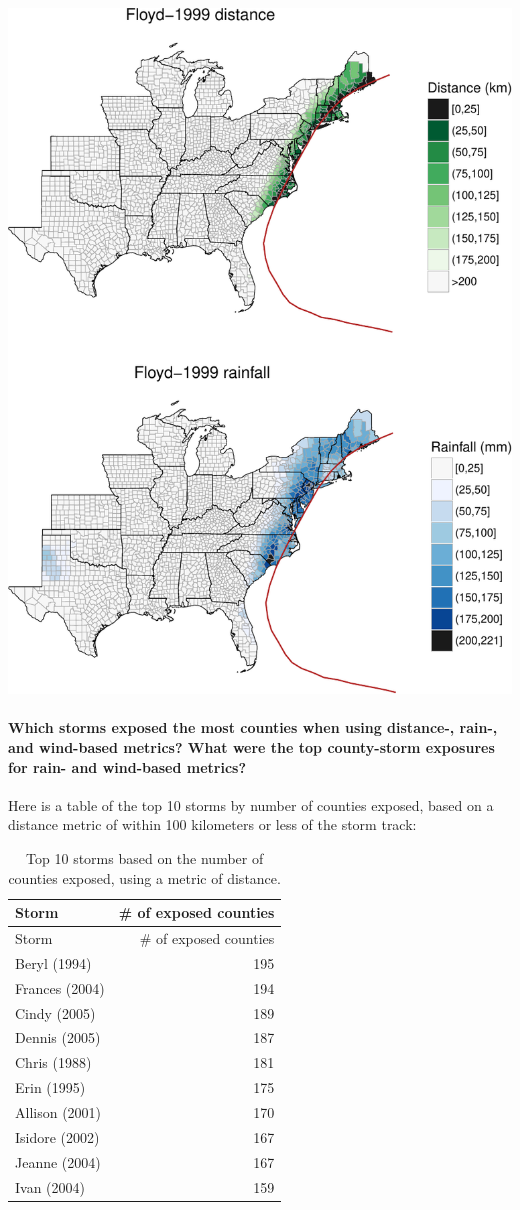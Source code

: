 \documentclass[]{elsarticle} %
\makeatletter
\def\maxwidth{\ifdim\Gin@nat@width>\linewidth\linewidth
\else\Gin@nat@width\fi}
\let\Oldincludegraphics\includegraphics
\renewcommand{\includegraphics}[1]{\Oldincludegraphics[width=\maxwidth]{#1}}
\makeatother
\begin{document}
\includegraphics{DraftExposurePaper_files/figure-latex/unnamed-chunk-8-1.pdf}

\paragraph{Which storms exposed the most counties when using distance-,
rain-, and wind-based metrics? What were the top county-storm exposures
for rain- and wind-based
metrics?}\label{which-storms-exposed-the-most-counties-when-using-distance--rain--and-wind-based-metrics-what-were-the-top-county-storm-exposures-for-rain--and-wind-based-metrics}

Here is a table of the top 10 storms by number of counties exposed,
based on a distance metric of within 100 kilometers or less of the storm
track:

\begin{longtable}[]{@{}lr@{}}
\caption{Top 10 storms based on the number of counties exposed, using a
metric of distance.}\tabularnewline
\toprule
Storm & \# of exposed counties\tabularnewline
\midrule
\endfirsthead
\toprule
Storm & \# of exposed counties\tabularnewline
\midrule
\endhead
Beryl (1994) & 195\tabularnewline
Frances (2004) & 194\tabularnewline
Cindy (2005) & 189\tabularnewline
Dennis (2005) & 187\tabularnewline
Chris (1988) & 181\tabularnewline
Erin (1995) & 175\tabularnewline
Allison (2001) & 170\tabularnewline
Isidore (2002) & 167\tabularnewline
Jeanne (2004) & 167\tabularnewline
Ivan (2004) & 159\tabularnewline
\bottomrule
\end{longtable}
\end{document}
